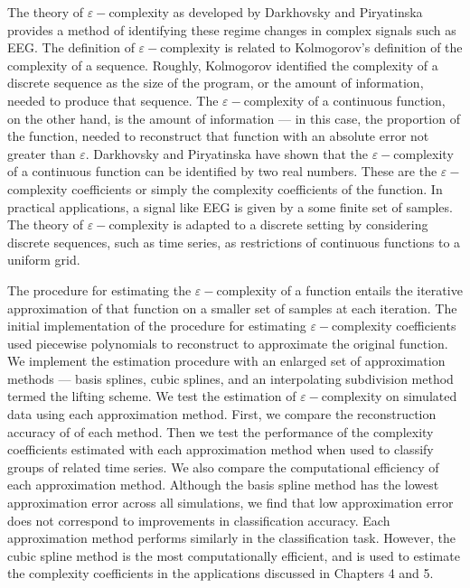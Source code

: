 The theory of $\varepsilon-$complexity as developed by 
Darkhovsky and Piryatinska provides a method
of identifying these regime changes
in complex signals such as EEG.
The definition of $\varepsilon-$complexity is related 
to Kolmogorov's definition of the complexity of a sequence.
Roughly, Kolmogorov identified the complexity
of a discrete sequence as the size of the program, or 
the amount of information, needed to produce that sequence. 
The $\varepsilon-$complexity of a continuous function, 
on the other hand, is the amount of information --- in this 
case, the proportion of the function, needed to reconstruct
that function with an absolute error not greater than 
$\varepsilon$. 
Darkhovsky and Piryatinska have shown that the 
$\varepsilon-$complexity of a continuous function 
can be identified by two real numbers\cite{darkhovsky2013}. 
These are the 
$\varepsilon-$complexity coefficients or simply the 
complexity coefficients of the function.
In practical applications, a signal like EEG is given by a
some finite set of samples. 
The theory of $\varepsilon-$complexity is adapted to a 
discrete setting by considering discrete sequences, such
as time series, as restrictions of continuous functions 
to a uniform grid.

The procedure for estimating the $\varepsilon-$complexity of 
a function entails the iterative approximation of that 
function on a smaller set of samples at each iteration. 
The initial implementation of the procedure for estimating $\varepsilon-$complexity coefficients
used piecewise polynomials to reconstruct to approximate the 
original function. We implement the estimation procedure with an enlarged set of approximation methods --- basis splines, cubic splines, and an interpolating subdivision 
method termed the lifting scheme. We test the estimation of 
$\varepsilon-$complexity on simulated data using each approximation
method. First, we compare the reconstruction accuracy of of 
each method. Then we test the performance of the complexity coefficients estimated with each approximation 
method when used to classify groups of related time series.
We also compare the computational efficiency of each 
approximation method. Although the basis spline method has the 
lowest approximation error across all simulations, we 
find that low approximation error does not correspond 
to improvements in classification accuracy. Each 
approximation method performs similarly in the classification 
task. However, the cubic spline method is the most computationally efficient, and is used to estimate the complexity coefficients in 
the applications discussed in Chapters 4 and 5.

